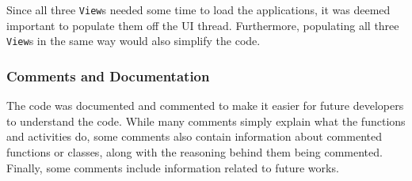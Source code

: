 Since all three \lstinline!View!s needed some time to load the applications, it was deemed important to populate them off the UI thread.
Furthermore, populating all three \lstinline!View!s in the same way would also simplify the code.

\subsubsection{Comments and Documentation}
The code was documented and commented to make it easier for future developers to understand the code.
While many comments simply explain what the functions and activities do, some comments also contain information about commented functions or classes, along with the reasoning behind them being commented.
Finally, some comments include information related to future works.